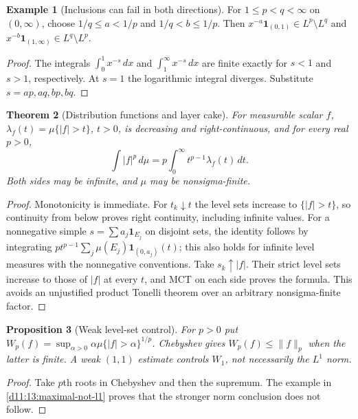 \documentclass[11pt,oneside,openany]{book}
\newtheorem{theorem}{Theorem}[chapter]
\newtheorem{proposition}[theorem]{Proposition}
\theoremstyle{definition}
\newtheorem{example}[theorem]{Example}
\theoremstyle{remark}
\newcommand{\one}{\mathbf1}\newcommand{\ind}[1]{\mathbf1_{#1}}
\newcommand{\family}[1]{}
\begin{document}
\begin{example}[Inclusions can fail in both directions]\family{D11.10.inclusion_failure}\label{d11:10:inclusion-failure}
For $1\leq p<q<\infty$ on $(0,\infty)$, choose
$1/q\leq a<1/p$ and $1/q<b\leq1/p$. Then
$x^{-a}\one_{(0,1)}\in L^p\setminus L^q$ and
$x^{-b}\one_{(1,\infty)}\in L^q\setminus L^p$.
\end{example}
\begin{proof}
The integrals $\int_0^1x^{-s}\,dx$ and $\int_1^\infty x^{-s}\,dx$
are finite exactly for $s<1$ and $s>1$, respectively. At $s=1$ the
logarithmic integral diverges. Substitute $s=ap,aq,bp,bq$.
\end{proof}

\begin{theorem}[Distribution functions and layer cake]\family{D11.10.distribution_layer_cake}\label{d11:10:distribution-layer-cake}
For measurable scalar $f$, $\lambda_f(t)=\mu\{|f|>t\}$, $t>0$, is
decreasing and right-continuous, and for every real $p>0$,
\[
 \int|f|^p\,d\mu=p\int_0^\infty t^{p-1}\lambda_f(t)\,dt.
\]
Both sides may be infinite, and $\mu$ may be nonsigma-finite.
\end{theorem}
\begin{proof}
Monotonicity is immediate. For $t_k\downarrow t$ the level sets increase
to $\{|f|>t\}$, so continuity from below proves right continuity, including
infinite values. For a nonnegative simple $s=\sum a_j\one_{E_j}$ on
disjoint sets, the identity follows by integrating
$p t^{p-1}\sum_j\mu(E_j)\one_{(0,a_j)}(t)$; this also holds for infinite
level measures with the nonnegative conventions. Take $s_k\uparrow|f|$.
Their strict level sets increase to those of $|f|$ at every $t$, and MCT
on each side proves the formula. This avoids an unjustified product
Tonelli theorem over an arbitrary nonsigma-finite factor.
\end{proof}

\begin{proposition}[Weak level-set control]\family{D11.10.weak_endpoint_bridge}\label{d11:10:weak-endpoint-bridge}
For $p>0$ put $W_p(f)=\sup_{\alpha>0}\alpha\mu\{|f|>\alpha\}^{1/p}$.
Chebyshev gives $W_p(f)\leq\|f\|_p$ when the latter is finite.
A weak $(1,1)$ estimate controls $W_1$, not necessarily the $L^1$ norm.
\end{proposition}
\begin{proof}
Take $p$th roots in Chebyshev and then the supremum. The example in
\cref{d11:13:maximal-not-l1} proves that the stronger norm conclusion does
not follow.
\end{proof}
\end{document}
